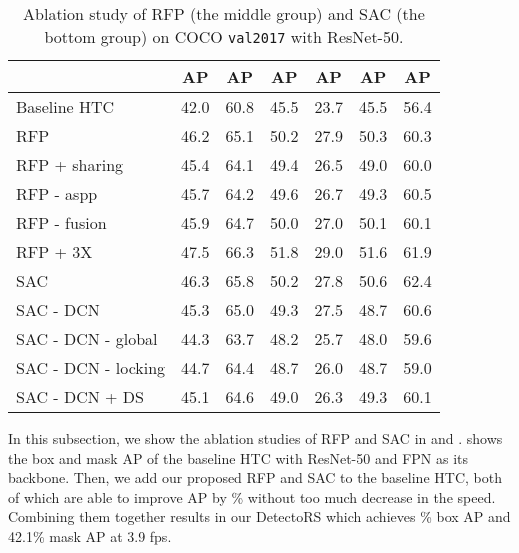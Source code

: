 \documentclass[final]{cvpr}
\begin{document}
\begin{table}[t]
\small
\setlength{\tabcolsep}{0.32em}

    \centering
    \begin{tabular}{l|cccccc}
    \toprule
    & AP & AP & AP & AP & AP & AP \\
    \midrule
    Baseline HTC & 42.0 & 60.8 & 45.5 & 23.7 & 45.5 & 56.4 \\
    \midrule
    RFP & 46.2 & 65.1 & 50.2 & 27.9 & 50.3 & 60.3 \\
    RFP + sharing & 45.4 & 64.1 & 49.4 & 26.5 & 49.0 & 60.0 \\
    RFP - aspp & 45.7 & 64.2 & 49.6 & 26.7 & 49.3 & 60.5 \\
    RFP - fusion & 45.9 & 64.7 & 50.0 & 27.0 & 50.1 & 60.1 \\
    RFP + 3X & 47.5 & 66.3 & 51.8 & 29.0 & 51.6 & 61.9 \\
    \midrule
    SAC & 46.3 & 65.8 & 50.2 & 27.8 & 50.6 & 62.4 \\
    SAC - DCN & 45.3 & 65.0 & 49.3 & 27.5 & 48.7 & 60.6 \\
    SAC - DCN - global & 44.3 & 63.7 & 48.2 & 25.7 & 48.0 & 59.6 \\
    SAC - DCN - locking & 44.7 & 64.4 & 48.7 & 26.0 & 48.7 & 59.0 \\
    SAC - DCN + DS & 45.1 & 64.6 & 49.0 & 26.3 & 49.3 & 60.1 \\
    \bottomrule
    \end{tabular}
    \caption{Ablation study of RFP (the middle group) and SAC (the bottom group) on COCO \texttt{val2017} with ResNet-50.}
    \label{tab:abl}   

\end{table}

In this subsection, we show the ablation studies of RFP and SAC in  and .
 shows the box and mask AP of the baseline HTC with ResNet-50 and FPN as its backbone.
Then, we add our proposed RFP and SAC to the baseline HTC, both of which are able to improve AP by \% without too much decrease in the speed.
Combining them together results in our DetectoRS which achieves \% box AP and 42.1\% mask AP at 3.9 fps.
\end{document}
